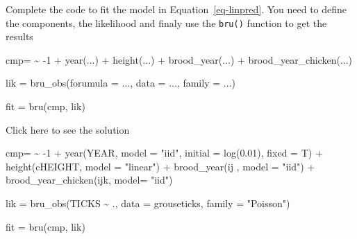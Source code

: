 \documentclass[
  letterpaper,
  DIV=11,
  numbers=noendperiod]{scrartcl}
\newenvironment{Shaded}{\begin{snugshade}}{\end{snugshade}}
\newcommand{\AttributeTok}[1]{\textcolor[rgb]{0.40,0.45,0.13}{#1}}
\newcommand{\DecValTok}[1]{\textcolor[rgb]{0.68,0.00,0.00}{#1}}
\newcommand{\ErrorTok}[1]{\textcolor[rgb]{0.68,0.00,0.00}{#1}}
\newcommand{\FloatTok}[1]{\textcolor[rgb]{0.68,0.00,0.00}{#1}}
\newcommand{\FunctionTok}[1]{\textcolor[rgb]{0.28,0.35,0.67}{#1}}
\newcommand{\NormalTok}[1]{\textcolor[rgb]{0.00,0.23,0.31}{#1}}
\newcommand{\OtherTok}[1]{\textcolor[rgb]{0.00,0.23,0.31}{#1}}
\newcommand{\SpecialCharTok}[1]{\textcolor[rgb]{0.37,0.37,0.37}{#1}}
\newcommand{\StringTok}[1]{\textcolor[rgb]{0.13,0.47,0.30}{#1}}
\begin{document}
\begin{tcolorbox}[enhanced jigsaw, bottomtitle=1mm, rightrule=.15mm, colbacktitle=quarto-callout-warning-color!10!white, coltitle=black, arc=.35mm, titlerule=0mm, breakable, colframe=quarto-callout-warning-color-frame, toptitle=1mm, title={Task}, left=2mm, colback=white, toprule=.15mm, opacitybacktitle=0.6, leftrule=.75mm, bottomrule=.15mm, opacityback=0]

Complete the code to fit the model in Equation~\ref{eq-linpred}. You
need to define the components, the likelihood and finaly use the
\texttt{bru()} function to get the results

\begin{Shaded}
\begin{Highlighting}[]
\NormalTok{cmp}\OtherTok{=} \ErrorTok{\textasciitilde{}} \SpecialCharTok{{-}}\DecValTok{1} \SpecialCharTok{+} \FunctionTok{year}\NormalTok{(...) }\SpecialCharTok{+}
  \FunctionTok{height}\NormalTok{(...) }\SpecialCharTok{+} 
  \FunctionTok{brood\_year}\NormalTok{(...) }\SpecialCharTok{+}
  \FunctionTok{brood\_year\_chicken}\NormalTok{(...)}

\NormalTok{lik }\OtherTok{=} \FunctionTok{bru\_obs}\NormalTok{(}\AttributeTok{forumula =}\NormalTok{ ...,}
              \AttributeTok{data =}\NormalTok{ ...,}
              \AttributeTok{family =}\NormalTok{ ...)}

\NormalTok{fit }\OtherTok{=} \FunctionTok{bru}\NormalTok{(cmp, lik)}
\end{Highlighting}
\end{Shaded}

Click here to see the solution

\begin{Shaded}
\begin{Highlighting}[]
\NormalTok{cmp}\OtherTok{=} \ErrorTok{\textasciitilde{}} \SpecialCharTok{{-}}\DecValTok{1} \SpecialCharTok{+} \FunctionTok{year}\NormalTok{(YEAR, }\AttributeTok{model =} \StringTok{"iid"}\NormalTok{, }\AttributeTok{initial =} \FunctionTok{log}\NormalTok{(}\FloatTok{0.01}\NormalTok{), }\AttributeTok{fixed =}\NormalTok{ T) }\SpecialCharTok{+}
  \FunctionTok{height}\NormalTok{(cHEIGHT, }\AttributeTok{model =}  \StringTok{"linear"}\NormalTok{) }\SpecialCharTok{+} 
  \FunctionTok{brood\_year}\NormalTok{(ij , }\AttributeTok{model =} \StringTok{"iid"}\NormalTok{) }\SpecialCharTok{+}
  \FunctionTok{brood\_year\_chicken}\NormalTok{(ijk, }\AttributeTok{model=} \StringTok{"iid"}\NormalTok{)}

\NormalTok{lik }\OtherTok{=} \FunctionTok{bru\_obs}\NormalTok{(TICKS }\SpecialCharTok{\textasciitilde{}}\NormalTok{ .,}
              \AttributeTok{data =}\NormalTok{ grouseticks,}
              \AttributeTok{family =} \StringTok{"Poisson"}\NormalTok{)}

  
\NormalTok{fit }\OtherTok{=} \FunctionTok{bru}\NormalTok{(cmp, lik)}
\end{Highlighting}
\end{Shaded}

\end{tcolorbox}
\end{document}
